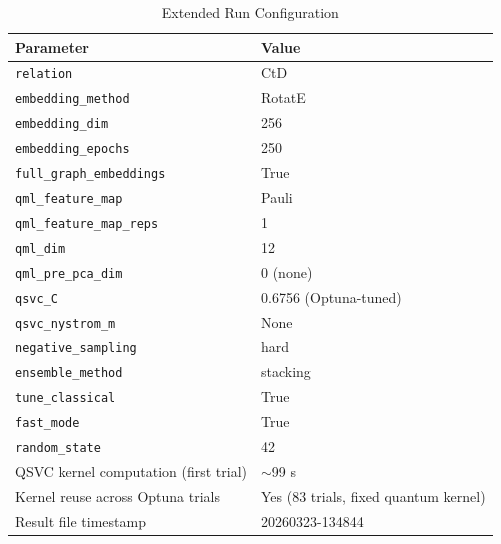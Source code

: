 \documentclass[twocolumn,10pt]{article}
\begin{document}
\begin{table}[t]
\centering
\caption{Extended Run Configuration}
\label{tab:config_extended}
\begin{tabular}{@{}ll@{}}
\toprule
\textbf{Parameter} & \textbf{Value} \\
\midrule
\texttt{relation} & CtD \\
\texttt{embedding\_method} & RotatE \\
\texttt{embedding\_dim} & 256 \\
\texttt{embedding\_epochs} & 250 \\
\texttt{full\_graph\_embeddings} & True \\
\texttt{qml\_feature\_map} & Pauli \\
\texttt{qml\_feature\_map\_reps} & 1 \\
\texttt{qml\_dim} & 12 \\
\texttt{qml\_pre\_pca\_dim} & 0 (none) \\
\texttt{qsvc\_C} & 0.6756 (Optuna-tuned) \\
\texttt{qsvc\_nystrom\_m} & None \\
\texttt{negative\_sampling} & hard \\
\texttt{ensemble\_method} & stacking \\
\texttt{tune\_classical} & True \\
\texttt{fast\_mode} & True \\
\texttt{random\_state} & 42 \\
QSVC kernel computation (first trial) & ${\sim}$99 s \\
Kernel reuse across Optuna trials & Yes (83 trials, fixed quantum kernel) \\
Result file timestamp & 20260323-134844 \\
\bottomrule
\end{tabular}
\end{table}
\end{document}
